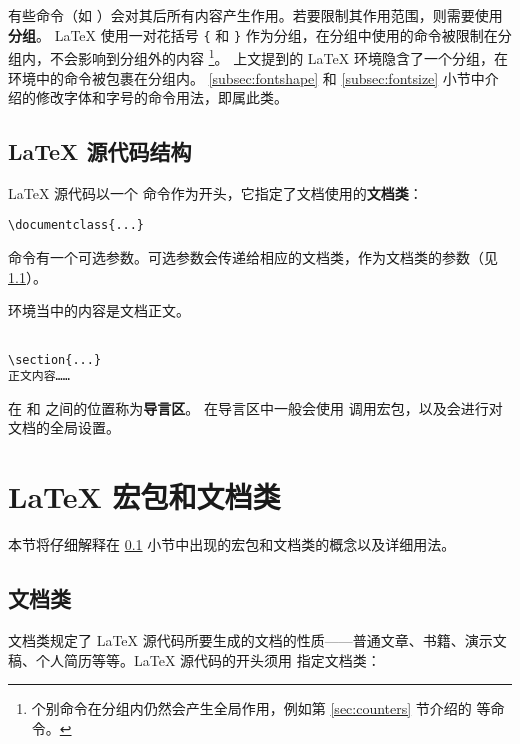 有些命令（如 ）会对其后所有内容产生作用。若要限制其作用范围，则需要使用\textbf{分组}。
\LaTeX{} 使用一对花括号 \verb|{| 和 \verb|}| 作为分组，在分组中使用的命令被限制在分组内，不会影响到分组外的内容%
\footnote{个别命令在分组内仍然会产生全局作用，例如第 \ref{sec:counters} 节介绍的  等命令。}。
上文提到的 \LaTeX{} 环境隐含了一个分组，在环境中的命令被包裹在分组内。
\ref{subsec:fontshape} 和 \ref{subsec:fontsize} 小节中介绍的修改字体和字号的命令用法，即属此类。

\subsection{\LaTeX{} 源代码结构}\label{subsec:struct}

\LaTeX{} 源代码以一个  命令作为开头，它指定了文档使用的\textbf{文档类}：
\begin{verbatim}
\documentclass{...}
\end{verbatim}
 命令有一个可选参数。可选参数会传递给相应的文档类，作为文档类的参数（见 \ref{subsec:classes}）。

 环境当中的内容是文档正文。
\begin{verbatim}

\section{...}
正文内容……

\end{verbatim}

在  和  之间的位置称为\textbf{导言区}。
在导言区中一般会使用  调用宏包，以及会进行对文档的全局设置。

\section{\LaTeX{} 宏包和文档类}\label{sec:latex-pkgs}

本节将仔细解释在 \ref{subsec:struct} 小节中出现的宏包和文档类的概念以及详细用法。

\subsection{文档类}\label{subsec:classes}

文档类规定了 \LaTeX{} 源代码所要生成的文档的性质——普通文章、书籍、演示文稿、个人简历等等。\LaTeX{} 源代码的开头须用
指定文档类：
\begin{command}
\end{command}

